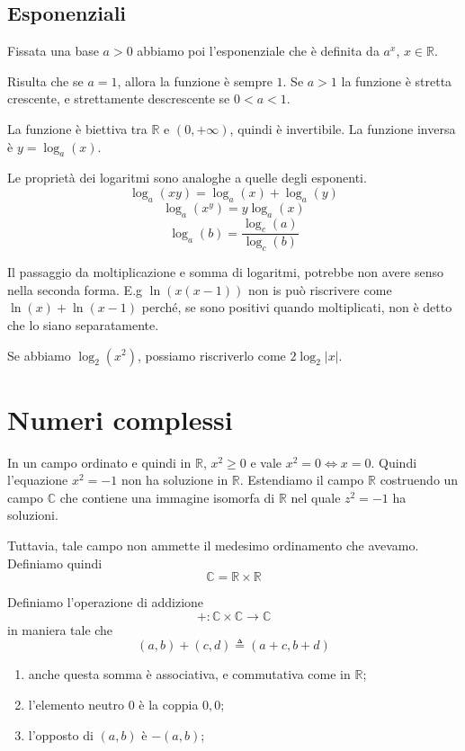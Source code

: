 \documentclass[a4paper]{article}
\begin{document}
\pagebreak

\subsection{Esponenziali}

Fissata una base \(a>0\) abbiamo poi l'esponenziale che è definita da \(a^x\),
\(x\in\mathbb{R}\).

Risulta che se \(a=1\), allora la funzione è sempre \(1\).
Se \(a>1\) la funzione è stretta crescente, e strettamente descrescente se \(0<a<1\).

La funzione è biettiva tra \(\mathbb{R}\) e \((0, +\infty)\), quindi è invertibile.
La funzione inversa è \(y=\log_a(x)\).

Le proprietà dei logaritmi sono analoghe a quelle degli esponenti.
 {
    \[
        \log_a(xy) = \log_a(x) + \log_a(y)
    \]
    \[
        \log_a(x^y) = y\log_a(x)
    \]
    \[
        \log_a(b) = \frac{\log_c(a)}{\log_c(b)}
    \]
}



Il passaggio da moltiplicazione e somma di logaritmi, potrebbe non avere senso
nella seconda forma.
E.g \(\ln(x(x-1))\) non is può riscrivere come \(\ln(x) + \ln(x-1)\)
perché, se sono positivi quando moltiplicati, non è detto che lo siano separatamente.

Se abbiamo \(\log_2(x^2)\), possiamo riscriverlo come \(2 \log_2|x|\).

\pagebreak

\section{Numeri complessi}

In un campo ordinato e quindi in \(\mathbb{R}\), \(x^2 \geq 0\) e vale \(x^2 = 0 \iff x=0\).
Quindi l'equazione \(x^2 = -1\) non ha soluzione in \(\mathbb{R}\).
Estendiamo il campo \(\mathbb{R}\) costruendo un campo \(\mathbb{C}\)
che contiene una immagine isomorfa di \(\mathbb{R}\) nel quale \(z^2 = -1\)
ha soluzioni.

Tuttavia, tale campo non ammette il medesimo ordinamento che avevamo.
Definiamo quindi
\[
    \mathbb{C} = \mathbb{R} \times \mathbb{R}
\]

Definiamo l'operazione di addizione
\[
    +\colon \mathbb{C} \times \mathbb{C} \to \mathbb{C}
\]
in maniera tale che
\[
    (a,b) + (c,d) \triangleq (a+c, b+d)
\]

\begin{enumerate}
    \item anche questa somma è associativa, e commutativa come in \(\mathbb{R}\);
    \item l'elemento neutro \(0\) è la coppia \(0,0\);
    \item l'opposto di \((a,b)\) è \(-(a,b)\);
\end{enumerate}
\end{document}
